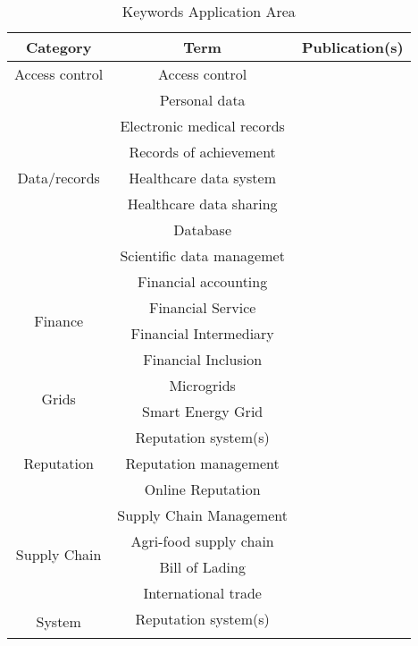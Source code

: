 \begin{longtable}{ |c|c|p{4cm}| }
	\caption{Keywords Application Area} \\
	\hline
 	\textbf{Category} & \textbf{Term} & \textbf{Publication(s)} \\ [0.5ex] 
 	\hline\hline
 	\endhead
 	Access control & Access control & \cite{2016_Azaria,2017_Ouaddah}\\ 
	 \hline
	 \multirow{7}{*}{Data/records} & Personal data & \cite{2015_Zyskind} \\  \cline{2-3}
	 & Electronic medical records & \cite{2016_Azaria} \\ \cline{2-3}
	 & Records of achievement & \cite{2016_Sharples} \\ \cline{2-3}
	 & Healthcare data system & \multirow{2}{*}{\cite{2016_Yue}} \\ \cline{2-2}
	 & Healthcare data sharing & \\ \cline{2-3}
	 & Database & \cite{2017_Coyne} \\ \cline{2-3}
	 & Scientific data managemet & \cite{2017_Gipp} \\
	 \hline
	 \multirow{4}{*}{Finance} & Financial accounting & \cite{2017_Coyne} \\ \cline{2-3}
	 & Financial Service & \multirow{3}{*}{\cite{2017_Jaag}} \\ \cline{2-2}
	 & Financial Intermediary &  \\ \cline{2-2}
	 & Financial Inclusion &  \\
	 \hline
	 \multirow{2}{*}{Grids} & Microgrids & \cite{2016_Kianmajd} \\ \cline{2-3}
	 & Smart Energy Grid & \cite{2018_Alessandra} \\
	 \hline
	 \multirow{3}{*}{Reputation} & Reputation system(s) & \cite{2015_Dennis,2016_Schaub} \\ \cline{2-3}
	 & Reputation management & \cite{2016_Sharples} \\ \cline{2-3}
	 & Online Reputation & \cite{2016_Yasin} \\
	 \hline
	 \multirow{4}{*}{Supply Chain} & Supply Chain Management & \cite{2017_Madhwal}\\ \cline{2-3}
	 & Agri-food supply chain & \cite{2016_Tian} \\ \cline{2-3}
	 & Bill of Lading & \multirow{2}{*}{\cite{2017_Naerland}} \\ \cline{2-2}
	 & International trade & \\
	 \hline
	 \multirow{5}{*}{System} & Reputation system(s) & \cite{2015_Dennis,2016_Schaub} \\ \cline{2-3}

\end{longtable}
